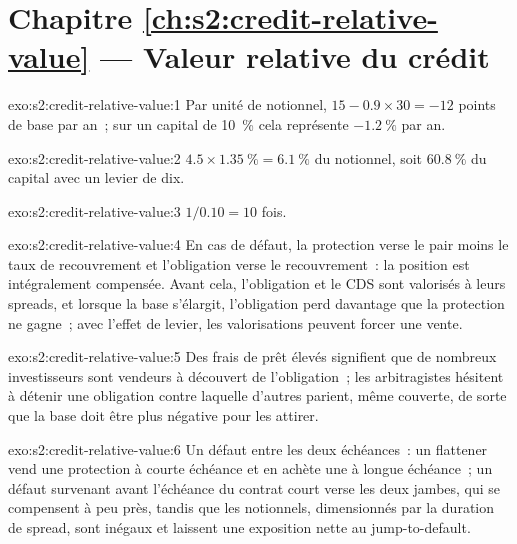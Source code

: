 \section*{Chapitre \ref{ch:s2:credit-relative-value} --- Valeur relative du crédit}

\begin{solution}{exo:s2:credit-relative-value:1}
Par unité de notionnel, $15 - 0.9 \times 30 = -12$ points de base par an~; sur un capital de 10~\% cela représente $-1.2~\%$ par an.
\end{solution}

\begin{solution}{exo:s2:credit-relative-value:2}
$4.5 \times 1.35~\% = 6.1~\%$ du notionnel, soit $60.8~\%$ du capital avec un levier de dix.
\end{solution}

\begin{solution}{exo:s2:credit-relative-value:3}
$1/0.10 = 10$ fois.
\end{solution}

\begin{solution}{exo:s2:credit-relative-value:4}
En cas de défaut, la protection verse le pair moins le taux de recouvrement et l'obligation verse le recouvrement~: la position est intégralement compensée. Avant cela, l'obligation et le CDS sont valorisés
à leurs spreads, et lorsque la base s'élargit, l'obligation perd davantage que la protection ne gagne~; avec l'effet de levier, les valorisations peuvent forcer une vente.
\end{solution}

\begin{solution}{exo:s2:credit-relative-value:5}
Des frais de prêt élevés signifient que de nombreux investisseurs sont vendeurs à découvert de l'obligation~; les arbitragistes hésitent à détenir une obligation contre laquelle d'autres parient, même couverte, de sorte que la
base doit être plus négative pour les attirer.
\end{solution}

\begin{solution}{exo:s2:credit-relative-value:6}
Un défaut entre les deux échéances~: un flattener vend une protection à courte échéance et en achète une à longue échéance~; un défaut survenant avant l'échéance du contrat court
verse les deux jambes, qui se compensent à peu près, tandis que les notionnels, dimensionnés par la duration de spread, sont inégaux et laissent une exposition nette au jump-to-default.
\end{solution}


